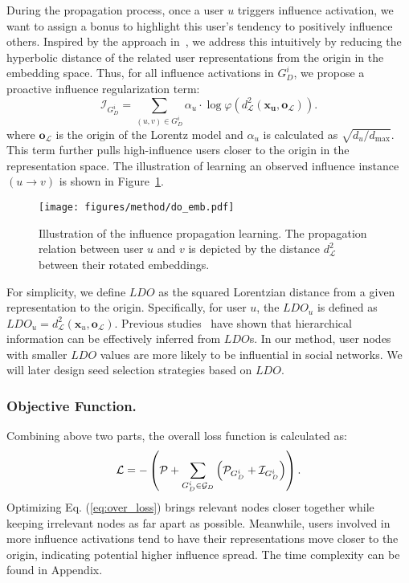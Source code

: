 During the propagation process, once a user $u$ triggers influence activation, we want to assign a bonus to highlight this user’s tendency to positively influence others. 
Inspired by the approach in~\cite{ICML2023_Yang}, we address this intuitively by reducing the hyperbolic distance of the related user representations from the origin in the embedding space.
Thus, for all influence activations in $G^i_D$, we propose a proactive influence regularization term:
\begin{equation}
 \mathcal{I}_{G^i_D} = \sum_{(u,v)\in G^i_D} \alpha_u \cdot \log \varphi \left(d^2_{\mathcal{L}}(\mathbf{x_u}, \mathbf{o}_{\mathcal{L}})\right).
\end{equation}
where $\mathbf{o}_{\mathcal{L}}$ is the origin of the Lorentz model and $\alpha_u$ is calculated as $\sqrt{d_u/d_{\text{max}}}$.
This term further pulls high-influence users closer to the origin in the representation space.
The illustration of learning an observed influence instance $(u \rightarrow v)$ is shown in Figure~\ref{fig:emb}.
\begin{figure}[h]
  \centering
  \texttt{[image: figures/method/do\_emb.pdf]}
  \caption{ Illustration of the influence propagation learning. The propagation relation between user $u$ and $v$ is depicted by the distance $d^2_{\mathcal{L}}$ between their rotated embeddings. }
  \label{fig:emb}
\end{figure}

For simplicity, we define $LDO$ as the squared Lorentzian distance from a given representation to the origin. Specifically, for user $u$, the $LDO_u$ is defined as $LDO_u = d^2_{\mathcal{L}}(\mathbf{x}_u, \mathbf{o}_{\mathcal{L}})$.
Previous studies~\cite{nickel2017poincare, ICML2023_Yang, feng2022role} have shown that hierarchical information can be effectively inferred from $LDO$s. In our method, user nodes with smaller $LDO$ values are more likely to be influential in social networks. 
We will later design seed selection strategies based on $LDO$.


\subsubsection{Objective Function.}

Combining above two parts, the overall loss function is calculated as:
\begin{equation}
\small
\mathcal{L} = - \left( \mathcal{P} + \sum_{G^i_D \in \mathcal{G}_D}\left(\mathcal{P}_{G^{i}_D} + \mathcal{I}_{G^i_D}\right)\right). 
\label{eq:over_loss}
\end{equation}
Optimizing Eq. (\ref{eq:over_loss}) brings relevant nodes closer together while keeping irrelevant nodes as far apart as possible. Meanwhile, users involved in more influence activations tend to have their representations move closer to the origin, indicating potential higher influence spread.
The time complexity can be found in Appendix.

